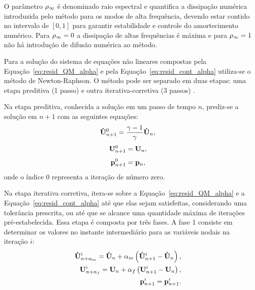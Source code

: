 O parâmetro $\rho_\infty$ é denominado raio espectral e quantifica a dissipação numérica introduzida pelo método para os modos de alta frequência, devendo estar contido no intervalo de $[0,1]$ para garantir estabilidade e controle do amortecimento numérico. Para $\rho_\infty = 0$ a dissipação de altas frequências é máxima e para $\rho_\infty = 1$ não há introdução de difusão numérica ao método.

Para a solução do sistema de equações não lineares compostas pela Equação~\eqref{eq:resid_QM_alpha} e pela Equação~\eqref{eq:resid_cont_alpha} utiliza-se o método de Newton-Raphson. O método pode ser separado em duas etapas: uma etapa preditiva (1 passo) e outra iterativa-corretiva (3 passos) \cite{BazilevsTT:2013a}.

Na etapa preditiva, conhecida a solução em um passo de tempo $n$, prediz-se a solução em $n+1$ com as seguintes equações:
\begin{align}
\mathbf{\dot{U}}_{n+1}^{0} = \frac{\gamma-1}{\gamma}\mathbf{\dot{U}}_{n} \label{eq:pred_acel},
\end{align}
\begin{align}
\mathbf{U}_{n+1}^{0} = \mathbf{U}_{n}, \label{eq:pred_vel}
\end{align}
\begin{align}
\mathbf{p}_{n+1}^{0} = \mathbf{p}_{n},\label{eq:pred_press}
\end{align}
\noindent onde o índice $0$ representa a iteração de número zero. 

Na etapa iterativa corretiva, itera-se sobre a Equação~\eqref{eq:resid_QM_alpha} e a Equação~\eqref{eq:resid_cont_alpha} até que elas sejam satisfeitas, considerando uma tolerância prescrita, ou até que se alcance uma quantidade máxima de iterações pré-estabelecida. Essa etapa é composta por três fases. A fase 1 consiste em determinar os valores no instante intermediário para as variáveis nodais na iteração $i$:
\begin{align}
\mathbf{\dot{U}}_{n+\alpha_m}^{i} = \mathbf{\dot{U}}_n + \alpha_m \left( \mathbf{\dot{U}}_{n+1}^{i} - \mathbf{\dot{U}}_n \right), \label{eq:inter_acel_i}\\
\mathbf{U}_{n+\alpha_f}^{i} = \mathbf{U}_n + \alpha_f \left( \mathbf{U}_{n+1}^{i} - \mathbf{U}_n \right), \label{eq:inter_vel_i}\\
\mathbf{p}_{n+1}^{i} = \mathbf{p}_{n+1}^{i} \label{eq:inter_press_i}.
\end{align}

